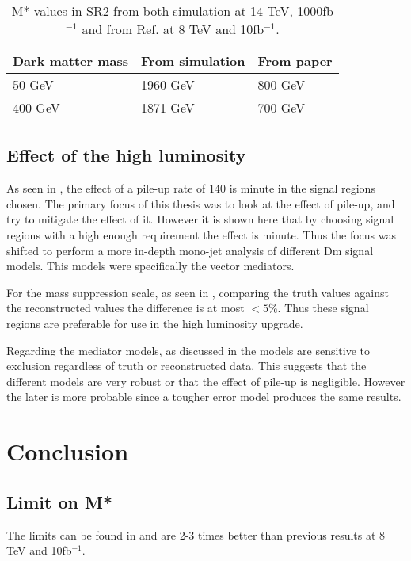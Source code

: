 \begin{table}[ht]
\begin{center}
\begin{tabular}{|l|l|l|}
\hline
Dark matter mass & From simulation & From paper \\ \hline
50 GeV & 1960 GeV &800 GeV \\
400 GeV & 1871 GeV & 700 GeV \\ \hline
\end{tabular}
\caption{M* values in SR2 from both simulation at 14 TeV, 1000fb$^{-1}$ and from Ref. \citep{ATLAS-CONF-2012-147} at 8 TeV and 10fb$^{-1}$. }
\label{Comp pval}
\end{center}
\end{table}

\subsection{Effect of the high luminosity}\label{subsec:hleff}
As seen in , the effect of a pile-up rate of 140 is minute in the signal regions chosen. The primary focus of this thesis was to look at the effect of pile-up, and try to mitigate the effect of it. However it is shown here that by choosing signal regions with a high enough requirement the effect is minute. Thus the focus was shifted to perform a more in-depth mono-jet analysis of different Dm signal models. This models were specifically the vector mediators.

For the mass suppression scale, as seen in , comparing the truth values against the reconstructed values the difference is at most $<5 \% $. Thus these signal regions are preferable for use in the high luminosity upgrade. 

Regarding the mediator models, as discussed in  the models are sensitive to exclusion regardless of truth or reconstructed data. This suggests that the different models are very robust or that the effect of pile-up is negligible. However the later is more probable since a tougher error model produces the same results.

\newpage
\section{Conclusion}
\subsection{Limit on M*}
The limits can be found in  and are 2-3 times better than previous results at 8 TeV and 10fb$^{-1}$.

